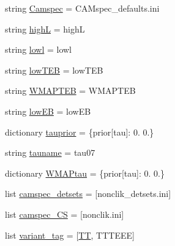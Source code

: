 \begin{DoxyCompactItemize}
\item 
string \mbox{\hyperlink{namespaceplanck_1_1settings__planck__2015_aaf2886507852ae0011cb13b7b278f53c}{Camspec}} = \textquotesingle{}C\+A\+Mspec\+\_\+defaults.\+ini\textquotesingle{}
\item 
string \mbox{\hyperlink{namespaceplanck_1_1settings__planck__2015_a6512faf61940007f9bb00321b3acefe8}{highL}} = \textquotesingle{}highL\textquotesingle{}
\item 
string \mbox{\hyperlink{namespaceplanck_1_1settings__planck__2015_a41173b899c33d009016b4cb152a5c6ae}{lowl}} = \textquotesingle{}lowl\textquotesingle{}
\item 
string \mbox{\hyperlink{namespaceplanck_1_1settings__planck__2015_aebd2b8562045a2be420b82276d85a6b5}{low\+T\+EB}} = \textquotesingle{}low\+T\+EB\textquotesingle{}
\item 
string \mbox{\hyperlink{namespaceplanck_1_1settings__planck__2015_a2606070643e1a63ca973fb6da9e23646}{W\+M\+A\+P\+T\+EB}} = \textquotesingle{}W\+M\+A\+P\+T\+EB\textquotesingle{}
\item 
string \mbox{\hyperlink{namespaceplanck_1_1settings__planck__2015_afed6a959fb6e680e5245f57a9bd1e3b4}{low\+EB}} = \textquotesingle{}low\+EB\textquotesingle{}
\item 
dictionary \mbox{\hyperlink{namespaceplanck_1_1settings__planck__2015_ac4cc3caefbd35ef6502ff098b7c6a229}{tauprior}} = \{\textquotesingle{}prior\mbox{[}tau\mbox{]}\textquotesingle{}\+: \textquotesingle{}0. 0.\textquotesingle{}\}
\item 
string \mbox{\hyperlink{namespaceplanck_1_1settings__planck__2015_ad25638318da12faf6582f9bc0e6c54d0}{tauname}} = \textquotesingle{}tau07\textquotesingle{}
\item 
dictionary \mbox{\hyperlink{namespaceplanck_1_1settings__planck__2015_a3ca8321192e0fb0b03f58da7ac40121f}{W\+M\+A\+Ptau}} = \{\textquotesingle{}prior\mbox{[}tau\mbox{]}\textquotesingle{}\+: \textquotesingle{}0. 0.\textquotesingle{}\}
\item 
list \mbox{\hyperlink{namespaceplanck_1_1settings__planck__2015_a520a23428181f0879ff4021313b4f1e9}{camspec\+\_\+detsets}} = \mbox{[}\textquotesingle{}nonclik\+\_\+detsets.\+ini\textquotesingle{}\mbox{]}
\item 
list \mbox{\hyperlink{namespaceplanck_1_1settings__planck__2015_a751f9b39dbe8685a881e66e05b1b2234}{camspec\+\_\+\+CS}} = \mbox{[}\textquotesingle{}nonclik.\+ini\textquotesingle{}\mbox{]}
\item 
list \mbox{\hyperlink{namespaceplanck_1_1settings__planck__2015_acca00fc8244ab010bc38b113dd59344e}{variant\+\_\+tag}} = \mbox{[}\textquotesingle{}\mbox{\hyperlink{plotTT_8m_a2f803268a6367d0943978eb5f84cc62e}{TT}}\textquotesingle{}, \textquotesingle{}T\+T\+T\+E\+EE\textquotesingle{}\mbox{]}

\end{DoxyCompactItemize}
